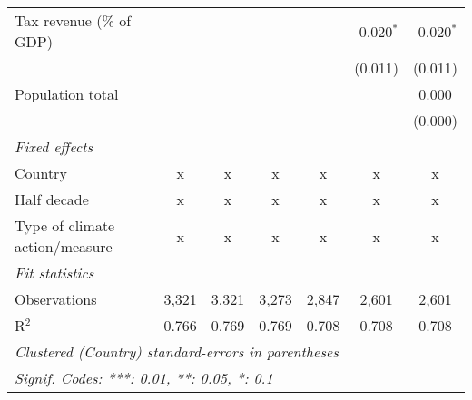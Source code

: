\begin{tabular}{lcccccc}
   Tax revenue (\% of GDP)                     &              &              &              &              & -0.020$^{*}$  & -0.020$^{*}$\\   
                                               &              &              &              &              & (0.011)       & (0.011)\\   
   Population total                            &              &              &              &              &               & 0.000\\   
                                               &              &              &              &              &               & (0.000)\\   
   \emph{Fixed effects}\\
   Country                                     & x            & x            & x            & x            & x             & x\\  
   Half decade                                 & x            & x            & x            & x            & x             & x\\  
   Type of climate action/measure              & x            & x            & x            & x            & x             & x\\  
   \midrule \emph{Fit statistics}\\
   Observations                                & 3,321        & 3,321        & 3,273        & 2,847        & 2,601         & 2,601\\  
   R$^2$                                       & 0.766        & 0.769        & 0.769        & 0.708        & 0.708         & 0.708\\  
   \midrule
   \multicolumn{7}{l}{\emph{Clustered (Country) standard-errors in parentheses}}\\
   \multicolumn{7}{l}{\emph{Signif. Codes: ***: 0.01, **: 0.05, *: 0.1}}\\
\end{tabular}
\par\endgroup


